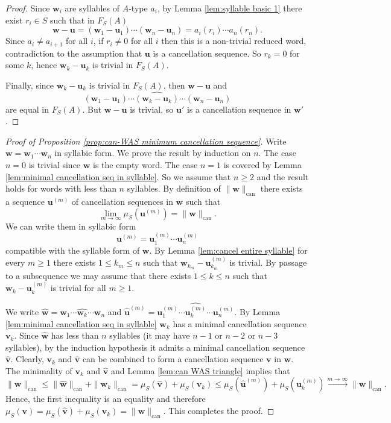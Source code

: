 \documentclass[12pt]{amsart}
\theoremstyle{definition}
\newcommand{\B}[1]{\mathbf{#1}}
\newcommand{\xto}[1]{\xrightarrow{#1}}
\def\can{\text{can}}
\def\Free{F}
\begin{document}
\begin{proof}
Since $\B w_i$ are syllables of $A$-type $a_i$, by Lemma \ref{lem:syllable basic 1} there exist $r_i \in S$ such that in $\Free_S(A)$
\[
\B w - \B u = (\B w_1-\B u_1) \cdots (\B w_n- \B u_n) = a_i(r_i) \cdots a_n(r_n).
\]
Since $a_i \neq a_{i+1}$ for all $i$, if $r_i \neq 0$ for all $i$ then this is a non-trivial reduced word, contradiction to the assumption that $\B u$ is a cancellation sequence.
So $r_k=0$ for some $k$, hence $\B w_k-\B u_k$ is trivial in $\Free_S(A)$.

Finally, since $\B w_k - \B u_k$ is trivial in $\Free_S(A)$, then $\B w - \B u$ and 
\[
(\B w_1-\B u_1) \cdots \widehat{(\B w_k- \B u_k)} \cdots (\B w_n- \B u_n)
\]
are equal in $\Free_S(A)$.
But $\B w - \B u$ is trivial,  so $\B u'$ is a cancellation sequence in $\B w'$.
\end{proof}




\begin{proof}[Proof of Proposition \ref{prop:can-WAS minimum cancellation sequence}]
Write $\B w = \B w_1 \cdots \B w_n$ in syllabic form. %
We prove the result by induction on $n$.
The case $n=0$ is trivial since $\B w$ is the empty word.
The case $n=1$ is covered by Lemma \ref{lem:minimal cancellation seq in syllable}.
So we assume that $n \geq 2$ and the result holds for words with less than $n$ syllables.
By definition of $\| \B w\|_{\can}$ 
there exists a sequence $\B u^{(m)}$ of cancellation sequences in $\B w$ such that
\[
\lim_{m \to \infty} \mu_S(\B u^{(m)}) = \| \B w\|_{\can}.
\]
We can write them in syllabic form
\[
\B u^{(m)} = \B u^{(m)}_1 \cdots \B u^{(m)}_n
\]
compatible with the syllable form of $\B w$.
By Lemma \ref{lem:cancel entire syllable} for every $m \geq 1$ there exists $1 \leq k_m \leq n$ such that $\B w_{k_m} - \B u^{(m)}_{k_m}$ is trivial.
By passage to a subsequence we may assume that there exists $1 \leq k \leq n$ such that $\B w_k - \B u^{(m)}_k$ is trivial for all $m \geq 1$.

We write $\hat{\B w} = \B w_1 \cdots \widehat{\B w_k} \cdots \B w_n$ and $\hat{\B u}^{(m)} = \B u_1^{(m)} \cdots \widehat{\B u_k^{(m)}} \cdots \B u_n^{(m)}$.
By Lemma \ref{lem:minimal cancellation seq in syllable} $\B w_k$ has a minimal cancellation sequence $\B v_k$.
Since $\hat{\B w}$ has less than $n$ syllables (it may have $n-1$ or $n-2$ or $n-3$ syllables), by the induction hypothesis it admits a minimal cancellation sequence $\hat{\B v}$.
Clearly, $\B v_k$ and $\hat{\B v}$ can be combined to form a cancellation sequence $\B v$ in $\B w$.
The minimality of $\B v_k$ and $\hat{\B v}$ and Lemma \ref{lem:can WAS triangle} implies that 
\[
\| \B w\|_{\can}
\leq 
\| \hat{\B  w}\|_{\can} +  \| \B w_k\|_{\can} 
=
\mu_S(\hat{\B v})+\mu_S(\B v_k)
\leq
\mu_S(\hat{\B u}^{(m)})+\mu_S(\B u_k^{(m)})
\xto{m \to \infty}
\| \B w \|_{\can}.
\]
Hence, the first inequality is an equality and therefore $\mu_S(\B v) = \mu_S(\hat{\B v})+\mu_S(\B v_k) = \| \B w \|_{\can}$.
This completes the proof.
\end{proof}
\end{document}
